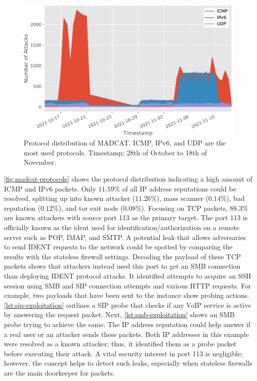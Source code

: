 \begin{figure}[ht]
    \centering
    \includegraphics[width=\textwidth]{figures/madcat-protocol-usage.pdf}
    \caption[Protocol distribution of MADCAT]{
        Protocol distribution of MADCAT. ICMP, IPv6, and UDP are the most used protocols.
        Timestamp; 28th of October to 18th of November.
    }
    \label{fig:madcat-protocols}
\end{figure}

\autoref{fig:madcat-protocols} shows the protocol distribution indicating a high amount of ICMP and IPv6 packets.
Only $11.59\%$ of all IP address reputations could be resolved, splitting up into known attacker ($11.26\%$), mass scanner ($0.14\%$), bad reputation ($0.12\%$), and tor exit node ($0.08\%$).
Focusing on TCP packets, $88.3\%$ are known attackers with source port 113 as the primary target.
The port 113 is officially known as the \ac{ident}\cite{rfc1413} used for identification/authorization on a remote server such as POP, IMAP, and SMTP.
A potential leak that allows adversaries to send IDENT requests to the network could be spotted by comparing the results with the stateless firewall settings.
Decoding the payload of these TCP packets shows that attackers instead used this port to get an SMB connection than deploying IDENT protocol attacks.
It identified attempts to acquire an SSH session using SMB and SIP connection attempts and various HTTP requests.
For example, two payloads that have been sent to the instance show probing actions.
\autoref{lst:sip-exploitation} outlines a SIP probe that checks if any VoIP service is active by answering the request packet.
Next, \autoref{lst:smb-exploitation} shows an SMB probe trying to achieve the same.
The IP address reputation could help answer if a real user or an attacker sends these packets.
Both IP addresses in this example were resolved as a known attacker; thus, it identified them as a probe packet before executing their attack.
A vital security interest in port 113 is negligible; however, the concept helps to detect such leaks, especially when stateless firewalls are the main doorkeeper for packets.

